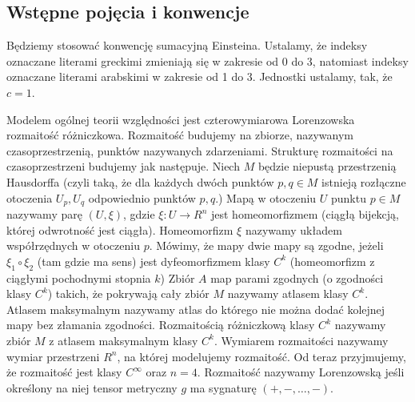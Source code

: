 \subsection{Wstępne pojęcia i konwencje}
Będziemy stosować konwencję sumacyjną Einsteina. Ustalamy, że 
indeksy oznaczane literami greckimi zmieniają się w zakresie od 0 do 3, 
natomiast indeksy oznaczane literami arabskimi 
w zakresie od 1 do 3. Jednostki ustalamy, tak, że $c=1$.


Modelem ogólnej teorii względności jest czterowymiarowa Lorenzowska 
rozmaitość różniczkowa. Rozmaitość budujemy na 
zbiorze, nazywanym czasoprzestrzenią, punktów nazywanych zdarzeniami. 
Strukturę rozmaitości na czasoprzestrzeni budujemy jak następuje.
Niech $M$ będzie niepustą przestrzenią Hausdorffa (czyli taką, że
dla każdych dwóch punktów $p,q\in M$ 
istnieją rozłączne otoczenia $U_p,U_q$ odpowiednio punktów $p,q$.) 
Mapą w otoczeniu $U$ punktu $p\in M$ nazywamy parę $(U,\xi )$, gdzie  
$\xi : U \to R^n$ jest homeomorfizmem (ciągłą bijekcją, której 
odwrotność jest ciągła). 
Homeomorfizm $\xi$ nazywamy układem współrzędnych 
w otoczeniu $p$.
Mówimy, że mapy dwie mapy są zgodne, jeżeli $\xi_1 \circ \xi_2$ (tam 
gdzie ma sens)
jest dyfeomorfizmem klasy $C^k$ (homeomorfizm z 
ciągłymi pochodnymi stopnia $k$)
Zbiór $A$ map parami zgodnych (o zgodności klasy $C^k$) 
takich, że pokrywają cały zbiór $M$ nazywamy 
atlasem klasy $C^k$. Atlasem maksymalnym nazywamy atlas do którego
nie można dodać kolejnej mapy bez złamania zgodności.
Rozmaitością różniczkową klasy $C^k$ nazywamy 
zbiór $M$ z atlasem maksymalnym klasy $C^k$.
Wymiarem rozmaitości nazywamy wymiar przestrzeni $R^n$, na której 
modelujemy rozmaitość. Od teraz przyjmujemy, że rozmaitość 
jest klasy $C^\infty$ oraz $n=4$.
Rozmaitość nazywamy Lorenzowską jeśli określony na niej tensor
metryczny $g$ ma sygnaturę $(+,-,\dots ,-)$.



